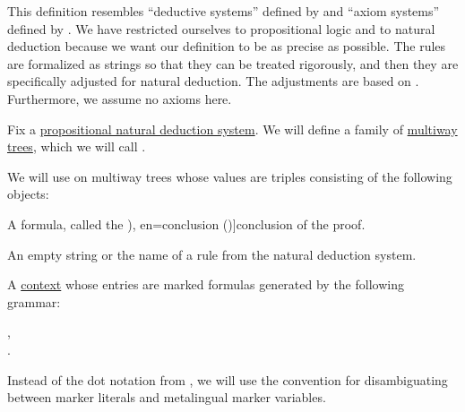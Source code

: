 \begin{comments}
  \item This definition resembles \enquote{deductive systems} defined by  and \enquote{axiom systems} defined by . We have restricted ourselves to propositional logic and to natural deduction because we want our definition to be as precise as possible. The rules are formalized as strings so that they can be treated rigorously, and then they are specifically adjusted for natural deduction. The adjustments are based on \cite[sec. 2.1]{TroelstraSchwichtenberg2000}. Furthermore, we assume no axioms here.
\end{comments}

\begin{definition}\label{def:natural_deduction_proof_tree}\mimprovised
  Fix a \hyperref[def:propositional_natural_deduction_system]{propositional natural deduction system}. We will define a family of \hyperref[def:multiway_tree]{multiway trees}, which we will call .

  We will use  on multiway trees whose values are triples consisting of the following objects:
  \begin{thmenum}[series=def:natural_deduction_proof_tree]
     A formula, called the \term[ru=conclusion (\cite[35]{TroelstraSchwichtenberg2000}), en=conclusion (\cite[36]{TroelstraSchwichtenberg2000})]{conclusion} of the proof.

     An empty string or the name of a rule from the natural deduction system.

     A \hyperref[def:logical_context]{context} whose entries are marked formulas generated by the following grammar:
    \begin{bnf*}
                {}, \\
        { \bnfsp \bnftsq{:} \bnfsp {}}.
    \end{bnf*}

    Instead of the dot notation from , we will use the convention  for disambiguating between marker literals and metalingual marker variables.
  \end{thmenum}


\end{definition}
